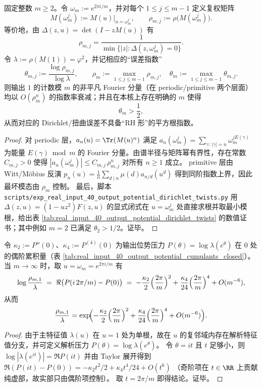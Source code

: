 \begin{proposition}\label{prop:real-input-40-output-dirichlet-nonrh}
固定整数 \(m\ge 2\)。令 \(\omega_m:=e^{2\pi i/m}\)，并对每个 \(1\le j\le m-1\) 定义复权矩阵
\[
M(\omega_m^j):=M(u)\big|_{u=\omega_m^j},
\qquad
\rho_{m,j}:=\rho\!\bigl(M(\omega_m^j)\bigr).
\]
等价地，由 \(\Delta(z,u)=\det(I-zM(u))\) 有
\[
\rho_{m,j}=\frac{1}{\min\{|z|:\Delta(z,\omega_m^j)=0\}}.
\]
令 \(\lambda:=\rho(M(1))=\varphi^2\)，并记相应的“误差指数”
\[
\theta_{m,j}:=\frac{\log \rho_{m,j}}{\log \lambda},
\qquad
\rho_m:=\max_{1\le j\le m-1}\rho_{m,j},\quad
\theta_m:=\max_{1\le j\le m-1}\theta_{m,j}.
\]
则输出 \(1\) 的计数模 \(m\) 的非平凡 Fourier 分量（在 periodic/primitive 两个层面）均以 \(O(\rho_m^n)\) 的指数率衰减；并且在本核上存在明确的 \(m\) 使得
\[
\theta_m>\frac12,
\]
从而对应的 Dirichlet/扭曲误差不具备“RH 形”的平方根指数。
\end{proposition}
\begin{proof}
对 periodic 层，\(a_n(u)=\Tr(M(u)^n)\) 满足
\(
a_n(\omega_m^j)=\sum_{\gamma:\,|\gamma|=n}\omega_m^{jE(\gamma)}
\)
为能量 \(E(\gamma)\bmod m\) 的 Fourier 分量。由谱半径与矩阵幂有界性，存在常数 \(C_{m,j}>0\) 使得
\(
|a_n(\omega_m^j)|\le C_{m,j}\,\rho_{m,j}^n
\)
对所有 \(n\ge 1\) 成立。
primitive 层由 Witt/Möbius 反演
\(
p_n(u)=\frac1n\sum_{d\mid n}\mu(d)a_{n/d}(u^d)
\)
得到同阶指数上界，因此最坏模态由 \(\rho_m\) 控制。
最后，脚本 \texttt{scripts/exp\_real\_input\_40\_output\_potential\_dirichlet\_twists.py} 用 \(\Delta(z,u)=(1-uz^2)F(z,u)\) 的显式闭式在 \(u=\omega_m^j\) 处直接求根并取最小模根，给出表 \ref{tab:real_input_40_output_potential_dirichlet_twists} 的数值证书；其中例如 \(m=2\) 已满足 \(\theta_2>1/2\)。证毕。
\end{proof}

\begin{corollary}\label{cor:real-input-40-output-dirichlet-cumulant-bridge}
令 \(\kappa_2:=P''(0)\)、\(\kappa_4:=P^{(4)}(0)\) 为输出位势压力 \(P(\theta)=\log\lambda(e^\theta)\) 在 \(0\) 处的偶阶累积量（表 \ref{tab:real_input_40_output_potential_cumulants_closed}）。
当 \(m\to\infty\) 时，取 \(u=\omega_m=e^{2\pi i/m}\) 有
\[
\log\frac{\rho_{m,1}}{\lambda}
\;=\;
\Re\bigl(P(i\,2\pi/m)-P(0)\bigr)
\;=\;
-\frac{\kappa_2}{2}\Bigl(\frac{2\pi}{m}\Bigr)^2
+\frac{\kappa_4}{24}\Bigl(\frac{2\pi}{m}\Bigr)^4
+O(m^{-6}),
\]
从而
\[
\frac{\rho_{m,1}}{\lambda}
=\exp\!\Bigl(
-\frac{\kappa_2}{2}\Bigl(\frac{2\pi}{m}\Bigr)^2
+\frac{\kappa_4}{24}\Bigl(\frac{2\pi}{m}\Bigr)^4
+O(m^{-6})
\Bigr).
\]
\end{corollary}
\begin{proof}
由于主特征值 \(\lambda(u)\) 在 \(u=1\) 处为单根，故在 \(u\) 的复邻域内存在解析特征值分支，并可定义解析压力 \(P(\theta)=\log\lambda(e^\theta)\)。
令 \(\theta=i t\) 且 \(t\) 足够小，则
\(
\log|\lambda(e^{it})|=\Re P(it)
\)
并由 Taylor 展开得到
\(
\Re(P(it)-P(0))=-\kappa_2 t^2/2+\kappa_4 t^4/24+O(t^6)
\)
（奇阶项在 \(t\in\RR\) 上贡献纯虚部，故实部只由偶阶项控制）。
取 \(t=2\pi/m\) 即得结论。证毕。
\end{proof}

